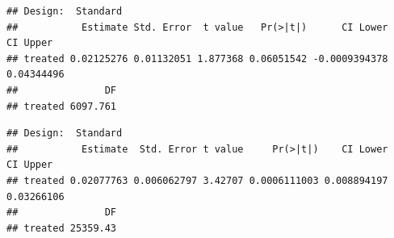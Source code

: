 \documentclass[
]{article}
\newenvironment{Shaded}{\begin{snugshade}}{\end{snugshade}}
\newcommand{\DataTypeTok}[1]{\textcolor[rgb]{0.13,0.29,0.53}{#1}}
\newcommand{\KeywordTok}[1]{\textcolor[rgb]{0.13,0.29,0.53}{\textbf{#1}}}
\newcommand{\NormalTok}[1]{#1}
\newcommand{\OperatorTok}[1]{\textcolor[rgb]{0.81,0.36,0.00}{\textbf{#1}}}
\newcommand{\StringTok}[1]{\textcolor[rgb]{0.31,0.60,0.02}{#1}}
\begin{document}
\begin{Shaded}
\end{Shaded}

\begin{verbatim}
## Design:  Standard 
##           Estimate Std. Error  t value   Pr(>|t|)      CI Lower   CI Upper
## treated 0.02125276 0.01132051 1.877368 0.06051542 -0.0009394378 0.04344496
##               DF
## treated 6097.761
\end{verbatim}

\begin{Shaded}
\end{Shaded}

\begin{verbatim}
## Design:  Standard 
##           Estimate  Std. Error t value     Pr(>|t|)    CI Lower   CI Upper
## treated 0.02077763 0.006062797 3.42707 0.0006111003 0.008894197 0.03266106
##               DF
## treated 25359.43
\end{verbatim}

\begin{Shaded}
\end{Shaded}
\end{document}
